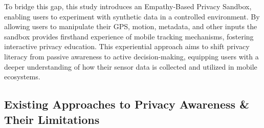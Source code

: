 \documentclass[acmlarge, nonacm]{acmart}
\begin{document}
To bridge this gap, this study introduces an Empathy-Based Privacy Sandbox, enabling users to experiment with synthetic data in a controlled environment. By allowing users to manipulate their GPS, motion, metadata, and other inputs the sandbox provides firsthand experience of mobile tracking mechanisms, fostering interactive privacy education. This experiential approach aims to shift privacy literacy from passive awareness to active decision-making, equipping users with a deeper understanding of how their sensor data is collected and utilized in mobile ecosystems.

\subsection{Existing Approaches to Privacy Awareness \& Their Limitations}
\end{document}
